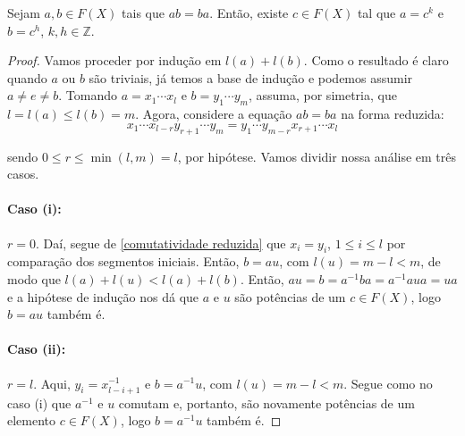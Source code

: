     	\begin{lemma}
    	\label{comutatividade em grupos livres}
    		Sejam $a,b\in F(X)$ tais que $ab=ba$. Então, existe $c\in F(X)$ tal que $a = c^k$ e 
    		$b = c^h$, $k, h\in\mathbb{Z}$.
    	\end{lemma}
    	\begin{proof}
    		Vamos proceder por indução em $l(a) + l(b)$. Como o resultado é claro quando $a$ ou $b$ 
    		são triviais, já temos a base de indução e podemos assumir $a\neq e\neq b$. Tomando 
    		$a = x_1\cdots x_l$ e $b = y_1\cdots y_m$, assuma, por simetria, que $l = l(a) \leq l(b) = m$. 
    		Agora, considere a equação $ab=ba$ na forma reduzida:
    		\begin{equation}
    		\label{comutatividade reduzida}
    		    x_1\cdots x_{l-r}y_{r+1}\cdots y_m = y_1\cdots y_{m-r}x_{r+1}\cdots x_l
    		\end{equation}
    		\par\vspace{0.3cm} sendo $0\leq r\leq\min(l,m) = l$, por hipótese. Vamos dividir nossa análise 
    		em três casos.
    		
    		\paragraph{Caso (i):} $r=0$. Daí, segue de \eqref{comutatividade reduzida} que 
    		$x_i=y_i$, $1\leq i\leq l$ por comparação dos segmentos iniciais. Então, $b = au$, com 
    		$l(u) = m-l<m$, de modo que $l(a) + l(u)< l(a) + l(b)$. Então, $au = b = a^{-1}ba = a^{-1}aua = ua$ 
    		e a hipótese de indução nos dá que $a$ e $u$ são potências de um $c\in F(X)$, logo $b=au$ também é.
    		
    		\paragraph{Caso (ii):} $r = l$. Aqui, $y_i = x_{l-i+1}^{-1}$ e $b = a^{-1}u$, com $l(u) = m-l<m$.
    		Segue como no caso (i) que $a^{-1}$ e $u$ comutam e, portanto, são novamente potências de um 
    		elemento $c\in F(X)$, logo $b = a^{-1}u$ também é.
    		

\end{proof}
